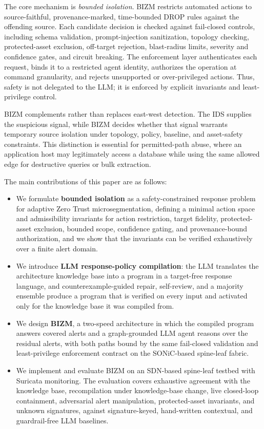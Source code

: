 \documentclass[final,5p]{elsarticle}
\begin{document}
The core mechanism is \emph{bounded isolation}. BIZM restricts automated actions to source-faithful, provenance-marked, time-bounded DROP rules against the offending source. Each candidate decision is checked against fail-closed controls, including schema validation, prompt-injection sanitization, topology checking, protected-asset exclusion, off-target rejection, blast-radius limits, severity and confidence gates, and circuit breaking. The enforcement layer authenticates each request, binds it to a restricted agent identity, authorizes the operation at command granularity, and rejects unsupported or over-privileged actions. Thus, safety is not delegated to the LLM; it is enforced by explicit invariants and least-privilege control.

BIZM complements rather than replaces east-west detection. The IDS supplies the suspicious signal, while BIZM decides whether that signal warrants temporary source isolation under topology, policy, baseline, and asset-safety constraints. This distinction is essential for permitted-path abuse, where an application host may legitimately access a database while using the same allowed edge for destructive queries or bulk extraction.

The main contributions of this paper are as follows:
\begin{itemize}
    \item We formulate \textbf{bounded isolation} as a safety-constrained response problem for adaptive Zero Trust microsegmentation, defining a minimal action space and admissibility invariants for action restriction, target fidelity, protected-asset exclusion, bounded scope, confidence gating, and provenance-bound authorization, and we show that the invariants can be verified exhaustively over a finite alert domain.
    \item We introduce \textbf{LLM response-policy compilation}: the LLM translates the architecture knowledge base into a program in a target-free response language, and counterexample-guided repair, self-review, and a majority ensemble produce a program that is verified on every input and activated only for the knowledge base it was compiled from.
    \item We design \textbf{BIZM}, a two-speed architecture in which the compiled program answers covered alerts and a graph-grounded LLM agent reasons over the residual alerts, with both paths bound by the same fail-closed validation and least-privilege enforcement contract on the SONiC-based spine-leaf fabric.
    \item We implement and evaluate BIZM on an SDN-based spine-leaf testbed with Suricata monitoring. The evaluation covers exhaustive agreement with the knowledge base, recompilation under knowledge-base change, live closed-loop containment, adversarial alert manipulation, protected-asset invariants, and unknown signatures, against signature-keyed, hand-written contextual, and guardrail-free LLM baselines.
\end{itemize}
\end{document}
